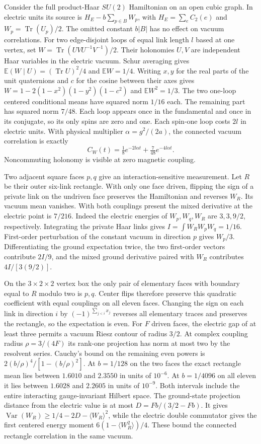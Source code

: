 \documentclass[11pt]{article}
\numberwithin{equation}{section}
\theoremstyle{remark}
\begin{document}
Consider the full product-Haar $SU(2)$ Hamiltonian on an open cubic graph.
In electric units its source is $H_E-b\sum_{p\in B}W_p$, with
$H_E=\sum_e C_2(e)$ and $W_p=\operatorname{Tr}(U_p)/2$. The omitted
constant $b|B|$ has no effect on vacuum correlations. For two edge-disjoint
loops of equal link length $l$ based at one vertex, set
$W=\operatorname{Tr}(UVU^{-1}V^{-1})/2$. Their holonomies $U,V$ are
independent Haar variables in the electric vacuum. Schur averaging gives
$\mathbb{E}(W\mid U)=(\operatorname{Tr}U)^2/4$ and $\mathbb{E}W=1/4$.
Writing $x,y$ for the real parts of the unit quaternions and $c$ for the
cosine between their axes gives
$W=1-2(1-x^2)(1-y^2)(1-c^2)$ and $\mathbb{E}W^2=1/3$.
The two one-loop centered conditional means have squared norm $1/16$ each.
The remaining part has squared norm $7/48$. Each loop appears once in the
fundamental and once in its conjugate, so its only spins are zero and one.
Each spin-one loop costs $2l$ in electric units. With physical multiplier
$\alpha=g^2/(2a)$, the connected vacuum correlation is exactly
\[
 C_W(t)=\tfrac18 e^{-2l\alpha t}+\tfrac7{48}e^{-4l\alpha t}.
\]
Noncommuting holonomy is visible at zero magnetic coupling.

Two adjacent square faces $p,q$ give an interaction-sensitive measurement.
Let $R$ be their outer six-link rectangle. With only one face driven,
flipping the sign of a private link on the undriven face preserves the
Hamiltonian and reverses $W_R$. Its vacuum mean vanishes. With both
couplings present the mixed derivative at the electric point is $7/216$.
Indeed the electric energies of $W_p,W_q,W_R$ are $3,3,9/2$, respectively.
Integrating the private Haar links gives
$I=\int W_R W_p W_q=1/16$. First-order perturbation of the constant vacuum
in direction $p$ gives $W_p/3$. Differentiating the ground expectation twice,
the two first-order vectors contribute $2I/9$, and the mixed ground derivative
paired with $W_R$ contributes $4I/[3(9/2)]$.

On the $3\times2\times2$ vertex box the only pair of elementary faces with
boundary equal to $R$ modulo two is $p,q$. Center flips therefore preserve this
quadratic coefficient with equal couplings on all eleven faces. Changing the
sign on each link in direction $i$ by $(-1)^{\sum_{j<i}x_j}$ reverses
all elementary traces and preserves the rectangle, so the expectation is even.
For $F$ driven faces, the electric gap of at least three permits a vacuum
Riesz contour of radius $3/2$. At complex coupling radius
$\rho=3/(4F)$ its rank-one projection has norm at most two by the resolvent
series. Cauchy's bound on the remaining even powers is
$2(b/\rho)^4/[1-(b/\rho)^2]$. At $b=1/128$ on the two faces the
exact rectangle mean lies between $1.6010$ and $2.3550$ in units of
$10^{-6}$. At $b=1/4096$ on all eleven it lies between $1.6028$ and
$2.2605$ in units of $10^{-9}$. Both intervals include the entire
interacting gauge-invariant Hilbert space. The ground-state projection
distance from the electric value is at most $D=Fb/(3/2-Fb)$. It gives
$\operatorname{Var}(W_R)\ge 1/4-2D-\langle W_R\rangle^2$, while
the electric double commutator gives the first centered energy moment
$6(1-\langle W_R^2\rangle)/4$. These bound the connected rectangle
correlation in the same vacuum.
\end{document}
